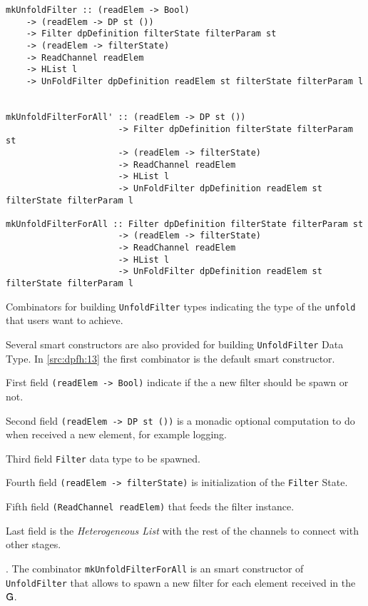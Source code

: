 \begin{listing}[H]
  \begin{verbatim}
mkUnfoldFilter :: (readElem -> Bool) 
    -> (readElem -> DP st ()) 
    -> Filter dpDefinition filterState filterParam st 
    -> (readElem -> filterState)
    -> ReadChannel readElem
    -> HList l 
    -> UnFoldFilter dpDefinition readElem st filterState filterParam l


mkUnfoldFilterForAll' :: (readElem -> DP st ())
                      -> Filter dpDefinition filterState filterParam st
                      -> (readElem -> filterState)
                      -> ReadChannel readElem
                      -> HList l
                      -> UnFoldFilter dpDefinition readElem st filterState filterParam l

mkUnfoldFilterForAll :: Filter dpDefinition filterState filterParam st
                      -> (readElem -> filterState)
                      -> ReadChannel readElem
                      -> HList l
                      -> UnFoldFilter dpDefinition readElem st filterState filterParam l
   \end{verbatim}
  \caption[{[\texttt{Stage.hs}] UnfoldFilter combinators}]{Combinators for building \texttt{UnfoldFilter} types indicating the type of the \texttt{unfold} that users want to achieve.}
  \label{src:dpfh:13}
\end{listing}

Several smart constructors are also provided for building \texttt{UnfoldFilter} Data Type.
In \autoref{src:dpfh:13} the first combinator is the default smart constructor.  \begin{inparaenum}[i\upshape)]
  \item First field \texttt{(readElem -> Bool)} indicate if the a new filter should be spawn or not.
  \item Second field \texttt{(readElem -> DP st ())} is a monadic optional computation to do when received a new element, for example logging.
  \item Third field \texttt{Filter} data type to be spawned.
  \item Fourth field \texttt{(readElem -> filterState)} is initialization of the \texttt{Filter} State.
  \item Fifth field \texttt{(ReadChannel readElem)} that feeds the filter instance.
  \item Last field is the \emph{Heterogeneous List} with the rest of the channels to connect with other stages.
\end{inparaenum}.
The combinator \texttt{mkUnfoldFilterForAll} is an smart constructor of \texttt{UnfoldFilter} that allows to spawn a new filter for each element received in the $\mathsf{G}$.

